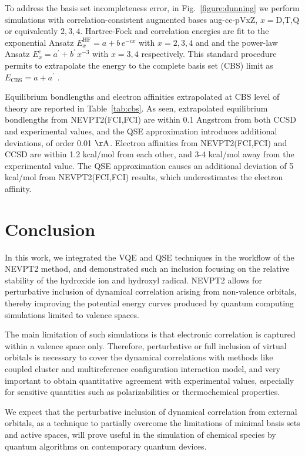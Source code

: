 \documentclass[aps,pra,twocolumn]{revtex4-2}
\begin{document}
To address the basis set incompleteness error, in Fig.~\ref{figure:dunning} we perform simulations with correlation-consistent augmented bases aug-cc-pVxZ, $x=$D,T,Q or equivalently $2,3,4$.
Hartree-Fock and correlation energies are fit to the exponential Ansatz $E^{\mathrm{HF}}_x = a + b \, e^{-cx}$ with $x=2,3,4$ and and the power-law Ansatz $E^{\mathrm{c}}_x = a^\prime + b^\prime \, x^{-3}$ with
$x=3,4$ respectively. This standard procedure permits to extrapolate the energy to the complete basis set (CBS) limit as $E_{\mathrm{CBS}} = a+a^\prime$ \cite{feller1992application,helgaker1997basis}.

Equilibrium bondlengths and electron affinities extrapolated at CBS level of theory are reported in Table~\ref{tab:cbs}.
As seen, extrapolated equilibrium bondlengths from NEVPT2(FCI,FCI) are within 0.1 Angstrom from both CCSD and experimental values, 
and the QSE approximation introduces additional deviations, of order 0.01 $\mathrm{\AA}$.
Electron affinities from NEVPT2(FCI,FCI) and CCSD are within 1.2 kcal/mol from each other, and 3-4 kcal/mol away from the experimental value.
The QSE approximation causes an additional deviation of 5 kcal/mol from NEVPT2(FCI,FCI) results, which underestimates the electron affinity.

\section{Conclusion}
\label{sec:conclusions}

In this work, we integrated the VQE and QSE techniques in the workflow of the NEVPT2 method, and demonstrated such an inclusion
focusing on the relative stability of the hydroxide ion and hydroxyl radical. 
NEVPT2 allows for perturbative inclusion of dynamical correlation arising from non-valence orbitals, 
thereby improving the potential energy curves produced by quantum computing simulations limited to valence spaces.

The main limitation of such simulations is that electronic correlation is captured within a valence space only. 
Therefore, perturbative or full inclusion of virtual orbitals is necessary to cover the dynamical correlations with methods like coupled cluster and multireference configuration interaction model, and very important to obtain quantitative agreement with experimental values, especially for sensitive quantities such as polarizabilities or thermochemical properties.

We expect that the perturbative inclusion of dynamical correlation from external orbitals, 
as a technique to partially overcome the limitations of minimal basis sets and active spaces, 
will prove useful in the simulation of chemical species by quantum algorithms on contemporary quantum devices.
\end{document}
